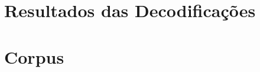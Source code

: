 \documentclass[12pt,twoside,a4paper]{book}
\renewcommand{\chaptermark}[1]{\markboth{\MakeUppercase{#1}}{}}
\begin{document}
\tableofcontents    %





\listoffigures            

\mainmatter

\fancyhead[RE,LO]{\thesection}

\onehalfspacing            %




%

%


\clearpage
\appendix
\chapter{Resultados das Decodificações}

\chapter{Corpus}





\renewcommand{\chaptermark}[1]{\markboth{\MakeUppercase{\appendixname\ \thechapter}} {\MakeUppercase{#1}} }
\fancyhead[RE,LO]{}
\appendix


% 

\backmatter \singlespacing   %



\end{document}
